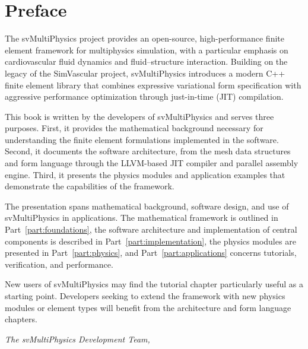 \chapter*{Preface}

The svMultiPhysics project provides an open-source, high-performance finite element
framework for multiphysics simulation, with a particular emphasis on cardiovascular
fluid dynamics and fluid--structure interaction. Building on the legacy of the
SimVascular project, svMultiPhysics introduces a modern C++ finite element library
that combines expressive variational form specification with aggressive
performance optimization through just-in-time (JIT) compilation.

This book is written by the developers of svMultiPhysics and serves three purposes.
First, it provides the mathematical background necessary for understanding the
finite element formulations implemented in the software.
Second, it documents the software architecture, from the mesh data structures and
form language through the LLVM-based JIT compiler and parallel assembly engine.
Third, it presents the physics modules and application examples that demonstrate the
capabilities of the framework.

The presentation spans mathematical background, software design, and use of
svMultiPhysics in applications. The mathematical framework is outlined in
Part~\ref{part:foundations}, the software architecture and implementation of
central components is described in Part~\ref{part:implementation}, the physics
modules are presented in Part~\ref{part:physics}, and Part~\ref{part:applications}
concerns tutorials, verification, and performance.

New users of svMultiPhysics may find the tutorial chapter particularly useful as a
starting point. Developers seeking to extend the framework with new physics modules
or element types will benefit from the architecture and form language chapters.

\bigskip\noindent
\textit{The svMultiPhysics Development Team, \the\year}
